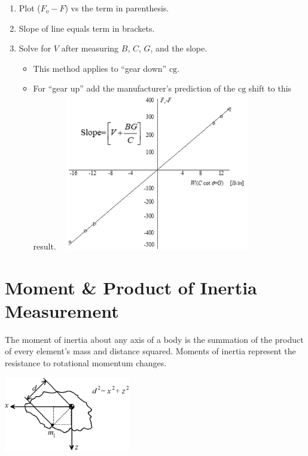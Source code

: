 \documentclass[
]{book}
\providecommand{\tightlist}{%
  \setlength{\itemsep}{0pt}\setlength{\parskip}{0pt}}
\begin{document}
\begin{enumerate}
\def\labelenumi{\arabic{enumi}.}
\setcounter{enumi}{3}
\tightlist
\item
  Plot (\(F_o-F\)) vs the term in parenthesis.
\item
  Slope of line equals term in brackets.
\item
  Solve for \(V\) after measuring \(B\), \(C\), \(G\), and the slope.

  \begin{itemize}
  \tightlist
  \item
    This method applies to ``gear down'' \(\mathrm{cg}\).
  \item
    For ``gear up'' add the manufacturer's prediction of the \(\mathrm{cg}\) shift to this result.
    ~
    \includegraphics[width=3.17083in,height=2.69792in]{media/07/image9.png}
  \end{itemize}
\end{enumerate}

\hypertarget{moment-product-of-inertia-measurement}{%
\section{Moment \& Product of Inertia Measurement~}\label{moment-product-of-inertia-measurement}}

The moment of inertia about any axis of a body is the summation of the product of every element's mass and distance squared. Moments of inertia represent the resistance to rotational momentum changes.

\includegraphics[width=2.16458in,height=1.28264in]{media/07/image13.png}
\end{document}
